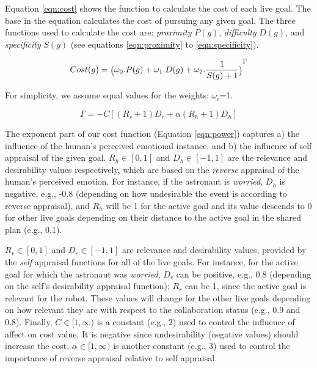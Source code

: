 \documentclass[12pt]{report}
\begin{document}
Equation \ref{eqn:cost} shows the function to calculate the cost of each
live goal. The base in the equation calculates the cost of pursuing any given
goal. The three functions used to calculate the cost are:
\textit{proximity} $P(g)$, \textit{difficulty} $D(g)$, and \textit{specificity}
$S(g)$ (see equations \ref{eqn:proximity} to \ref{eqn:specificity}).

\begin{equation}
{\fontsize{6}{9}\selectfont Cost(g) =
\big(\omega_0.P(g)+\omega_1.D(g)+\omega_2.\frac{1}{S(g)+1}\big)}^{\Gamma}
\label{eqn:cost}
\end{equation}

\noindent For simplicity, we assume equal values for the weights: $\omega_i$=1.

\begin{equation}
\Gamma=-C[(R_r+1)D_r + \alpha(R_h+1)D_h]
\label{eqn:power}
\end{equation}

The exponent part of our cost function (Equation \ref{eqn:power}) captures a)
the influence of the human's perceived emotional instance, and b) the influence
of self appraisal of the given goal. $R_h\in[0,1]$ and $D_h\in[-1,1]$ are the
relevance and desirability values respectively, which are based on the
\textit{reverse} appraisal of the human's perceived emotion. For instance, if
the astronaut is \textit{worried}, $D_h$ is negative, e.g., -0.8 (depending on
how undesirable the event is according to reverse appraisal), and $R_h$ will be
1 for the active goal and its value descends to 0 for other live goals depending
on their distance to the active goal in the shared plan (e.g., 0.1).

$R_r\in[0,1]$ and $D_r\in[-1,1]$ are relevance and desirability values, provided
by the \textit{self} appraisal functions for all of the live goals. For
instance, for the active goal for which the astronaut was \textit{worried},
$D_r$ can be positive, e.g., 0.8 (depending on the self's desirability appraisal
function); $R_r$ can be 1, since the active goal is relevant for the robot.
These values will change for the other live goals depending on how
relevant they are with respect to the collaboration status (e.g., 0.9 and 0.8).
Finally, $C\in[1,\infty)$ is a constant (e.g., 2) used to control the influence
of affect on cost value. It is negative since undesirability (negative values)
should increase the cost. $\alpha\in[1,\infty)$ is another constant (e.g., 3)
used to control the importance of reverse appraisal relative to self appraisal.
\end{document}
